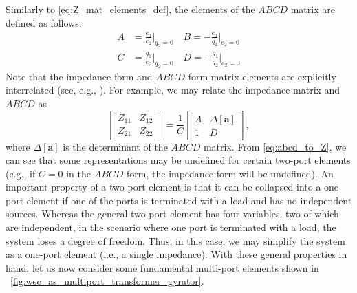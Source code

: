 \documentclass[lettersize,journal]{IEEEtran}
\begin{document}
%
Similarly to \eqref{eq:Z_mat_elements_def}, the elements of the $ABCD$ matrix are defined as follows.
%
\begin{subequations} \label{eq:abcd_mat_elements_def}
        \begin{align}
                A &= \frac{e_1}{e_2} \bigg \vert_{q_2=0}  \quad
                B = - \frac{e_1}{q_2} \bigg \vert_{e_2=0}  \\[1em]
                C &= \frac{q_1}{e_2} \bigg \vert_{q_2=0}  \quad
                D = - \frac{q_1}{q_2} \bigg \vert_{e_2=0} 
        \end{align}
\end{subequations}
%
Note that the impedance form and $ABCD$ form matrix elements are explicitly interrelated (see, e.g., \cite{CircuitFundamental}).
For example, we may relate the impedance matrix and $ABCD$ as
%
\begin{equation}
        \begin{bmatrix}
                Z_{11} & Z_{12} \\ Z_{21} & Z_{22}
        \end{bmatrix}
        =
        \frac{1}{C}
        \begin{bmatrix}
                A & \Delta \left[ \mathbf{a} \right] \\ 1 & D
        \end{bmatrix},
\label{eq:abcd_to_Z}
\end{equation}
%
where $\Delta \left[ \mathbf{a} \right]$ is the determinant of the $ABCD$ matrix.
From \eqref{eq:abcd_to_Z}, we can see that some representations may be undefined for certain two-port elements (e.g., if $C=0$ in the $ABCD$ form, the impedance form will be undefined).
%
An important property of a two-port element is that it can be collapsed into a one-port element if one of the ports is terminated with a load and has no independent sources. 
Whereas the general two-port element has four variables, two of which are independent, in the scenario where one port is terminated with a load, the system loses a degree of freedom. 
Thus, in this case, we may simplify the system as a one-port element (i.e., a single impedance). 
With these general properties in hand, let us now consider some fundamental multi-port elements shown in \figurename~\ref{fig:wec_as_multiport_transformer_gyrator}.

\end{document}
